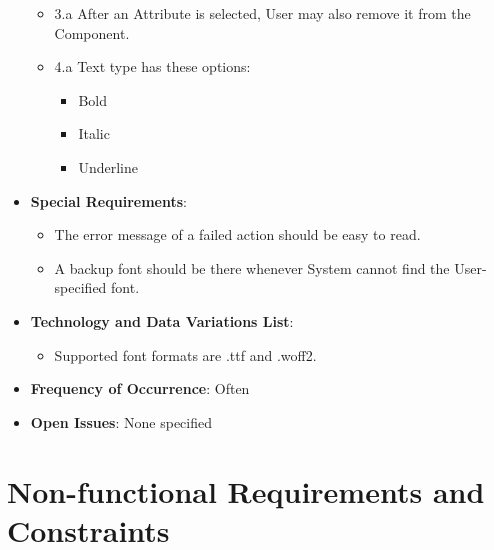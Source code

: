 \documentclass[12pt]{article}
\begin{document}
\begin{itemize}
\begin{itemize}
            \item 3.a After an Attribute is selected, User may also remove it from the Component.
            \item 4.a Text type has these options:
            \begin{itemize}
                \item Bold
                \item Italic
                \item Underline
            \end{itemize}
        \end{itemize}
        \item \textbf{Special Requirements}:
        \begin{itemize}
            \item The error message of a failed action should be easy to read.
            \item A backup font should be there whenever System cannot find the User-specified font.
        \end{itemize}
        \item \textbf{Technology and Data Variations List}:
        \begin{itemize}
            \item Supported font formats are .ttf and .woff2.
        \end{itemize}
        \item \textbf{Frequency of Occurrence}: Often
        \item \textbf{Open Issues}: None specified
    \end{itemize}






    \section{Non-functional Requirements and Constraints}
\end{document}
